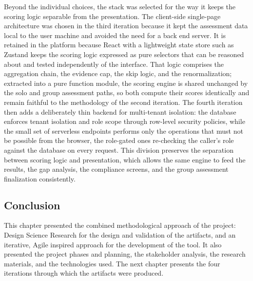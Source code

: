 Beyond the individual choices, the stack was selected for the way it keeps the scoring logic separable from the presentation. The client-side single-page architecture was chosen in the third iteration because it kept the assessment data local to the user machine and avoided the need for a back end server. It is retained in the platform because React with a lightweight state store such as Zustand keeps the scoring logic expressed as pure selectors that can be reasoned about and tested independently of the interface. That logic comprises the aggregation chain, the evidence cap, the skip logic, and the renormalization; extracted into a pure function module, the scoring engine is shared unchanged by the solo and group assessment paths, so both compute their scores identically and remain faithful to the methodology of the second iteration. The fourth iteration then adds a deliberately thin backend for multi-tenant isolation: the database enforces tenant isolation and role scope through row-level security policies, while the small set of serverless endpoints performs only the operations that must not be possible from the browser, the role-gated ones re-checking the caller's role against the database on every request. This division preserves the separation between scoring logic and presentation, which allows the same engine to feed the results, the gap analysis, the compliance screens, and the group assessment finalization consistently.

\subsection{Conclusion}

This chapter presented the combined methodological approach of the project: Design Science Research for the design and validation of the artifacts, and an iterative, Agile inspired approach for the development of the tool. It also presented the project phases and planning, the stakeholder analysis, the research materials, and the technologies used. The next chapter presents the four iterations through which the artifacts were produced.
